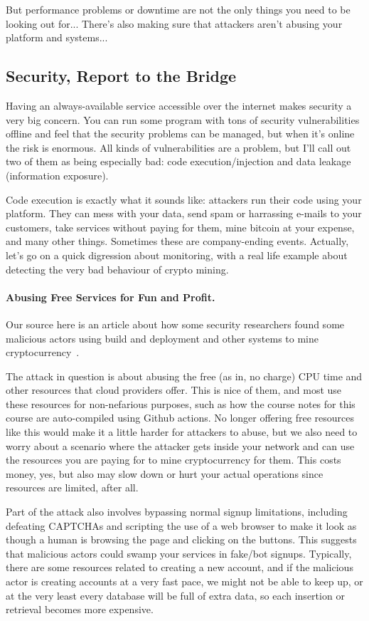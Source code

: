 But performance problems or downtime are not the only things you need to be looking out for... There's also making sure that attackers aren't abusing your platform and systems...

\subsection*{Security, Report to the Bridge}
Having an always-available service accessible over the internet makes security a very big concern. You can run some program with tons of security vulnerabilities offline and feel that the security problems can be managed, but when it's online the risk is enormous. All kinds of vulnerabilities are a problem, but I'll call out two of them as being especially bad: code execution/injection and data leakage (information exposure). 

Code execution is exactly what it sounds like: attackers run their code using your platform. They can mess with your data, send spam or harrassing e-mails to your customers, take services without paying for them, mine bitcoin at your expense, and many other things. Sometimes these are company-ending events. Actually, let's go on a quick digression about monitoring, with a real life example about detecting the very bad behaviour of crypto mining.

\paragraph{Abusing Free Services for Fun and Profit.}
Our source here is an article about how some security researchers found some malicious actors using build and deployment and other systems to mine cryptocurrency~\cite{sysdig}.

The attack in question is about abusing the free (as in, no charge) CPU time and other resources that cloud providers offer. This is nice of them, and most use these resources for non-nefarious purposes, such as how the course notes for this course are auto-compiled using Github actions. No longer offering free resources like this would make it a little harder for attackers to abuse, but we also need to worry about a scenario where the attacker gets inside your network and can use the resources you are paying for to mine cryptocurrency for them. This costs money, yes, but also may slow down or hurt your actual operations since resources are limited, after all.

Part of the attack also involves bypassing normal signup limitations, including defeating CAPTCHAs and scripting the use of a web browser to make it look as though a human is browsing the page and clicking on the buttons. This suggests that malicious actors could swamp your services in fake/bot signups. Typically, there are some resources related to creating a new account, and if the malicious actor is creating accounts at a very fast pace, we might not be able to keep up, or at the very least every database will be full of extra data, so each insertion or retrieval becomes more expensive.

